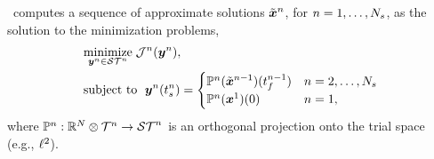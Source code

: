 \methodAcronym\ computes a sequence of approximate solutions $\tilde{\boldsymbol x}^{n}$, for $n=1,\ldots,N_s$, as the solution to the minimization problems,
\begin{equation}\label{eq:tclsrm}
\begin{split}
      &\underset{\boldsymbol y^{n} \in \mathcal{ ST }^n}{\text{minimize}} \; \mathcal{J}^n(\boldsymbol y^{n}), \\
      &\text{subject to } \;  \boldsymbol y^{n}(t_s^{n}) =
\begin{cases}\mathbb{P}^n (\tilde{\boldsymbol x}^{n-1})(t_f^{n-1}) & n = 2,\ldots,N_s \\
\mathbb{P}^n( {\boldsymbol x}^{1})(0)& n=1, \end{cases} 
\end{split}
\end{equation}
where $\mathbb{P}^n: \mathbb{R}^{N} \otimes \mathcal{T}^{n} \rightarrow \mathcal{ ST }^{n}$ is an orthogonal projection onto the 
trial space (e.g., $\ell^2$).
